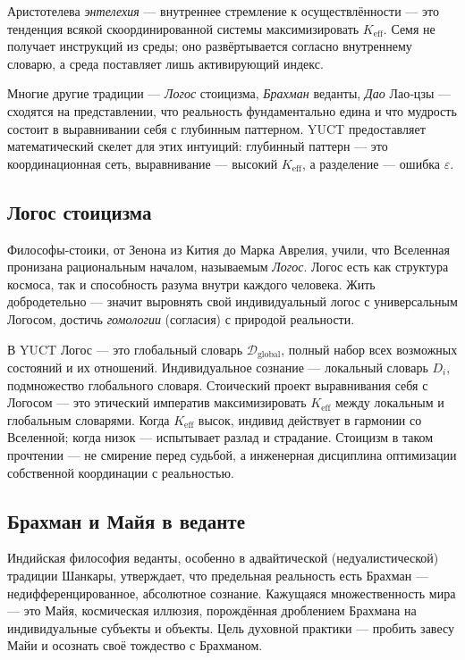 \documentclass[12pt,a4paper]{article}
\begin{document}
	Аристотелева \emph{энтелехия} — внутреннее стремление к осуществлённости — это тенденция всякой скоординированной системы максимизировать \(K_{\mathrm{eff}}\). Семя не получает инструкций из среды; оно развёртывается согласно внутреннему словарю, а среда поставляет лишь активирующий индекс.
	
	Многие другие традиции — \emph{Логос} стоицизма, \emph{Брахман} веданты, \emph{Дао} Лао‑цзы — сходятся на представлении, что реальность фундаментально едина и что мудрость состоит в выравнивании себя с глубинным паттерном. YUCT предоставляет математический скелет для этих интуиций: глубинный паттерн — это координационная сеть, выравнивание — высокий \(K_{\mathrm{eff}}\), а разделение — ошибка \(\varepsilon\).
	
	\subsection{Логос стоицизма}
	
	Философы‑стоики, от Зенона из Кития до Марка Аврелия, учили, что Вселенная пронизана рациональным началом, называемым \emph{Логос}. Логос есть как структура космоса, так и способность разума внутри каждого человека. Жить добродетельно — значит выровнять свой индивидуальный логос с универсальным Логосом, достичь \emph{гомологии} (согласия) с природой реальности.
	
	В YUCT Логос — это глобальный словарь \(\mathcal{D}_{\text{global}}\), полный набор всех возможных состояний и их отношений. Индивидуальное сознание — локальный словарь \(D_i\), подмножество глобального словаря. Стоический проект выравнивания себя с Логосом — это этический императив максимизировать \(K_{\mathrm{eff}}\) между локальным и глобальным словарями. Когда \(K_{\mathrm{eff}}\) высок, индивид действует в гармонии со Вселенной; когда низок — испытывает разлад и страдание. Стоицизм в таком прочтении — не смирение перед судьбой, а инженерная дисциплина оптимизации собственной координации с реальностью.
	
	\subsection{Брахман и Майя в веданте}
	
	Индийская философия веданты, особенно в адвайтической (недуалистической) традиции Шанкары, утверждает, что предельная реальность есть Брахман — недифференцированное, абсолютное сознание. Кажущаяся множественность мира — это Майя, космическая иллюзия, порождённая дроблением Брахмана на индивидуальные субъекты и объекты. Цель духовной практики — пробить завесу Майи и осознать своё тождество с Брахманом.
	
\end{document}
